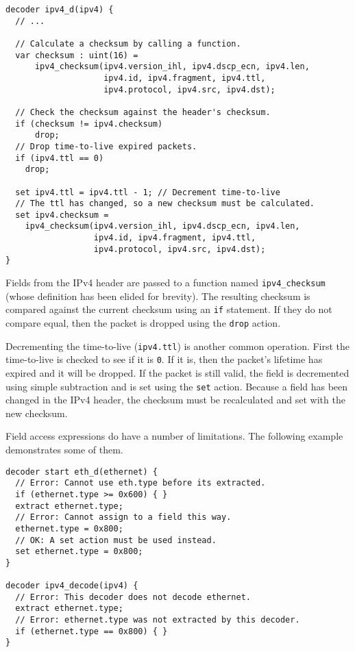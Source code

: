 \begin{codepage}
\begin{lstlisting}
decoder ipv4_d(ipv4) {
  // ...
  
  // Calculate a checksum by calling a function.
  var checksum : uint(16) =
      ipv4_checksum(ipv4.version_ihl, ipv4.dscp_ecn, ipv4.len, 
                    ipv4.id, ipv4.fragment, ipv4.ttl, 
                    ipv4.protocol, ipv4.src, ipv4.dst);

  // Check the checksum against the header's checksum.
  if (checksum != ipv4.checksum)
	  drop;
  // Drop time-to-live expired packets.
  if (ipv4.ttl == 0)
    drop;

  set ipv4.ttl = ipv4.ttl - 1; // Decrement time-to-live
  // The ttl has changed, so a new checksum must be calculated.
  set ipv4.checksum =
    ipv4_checksum(ipv4.version_ihl, ipv4.dscp_ecn, ipv4.len, 
                  ipv4.id, ipv4.fragment, ipv4.ttl, 
                  ipv4.protocol, ipv4.src, ipv4.dst);
}
\end{lstlisting}
\end{codepage}

Fields from the IPv4 header are passed to a function named 
\texttt{ipv4\_checksum} (whose definition has been elided for brevity). The 
resulting checksum is compared against the current checksum using an \texttt{if} 
statement. If they do not compare equal, then the packet is dropped using the 
\texttt{drop} action.

Decrementing the time-to-live (\texttt{ipv4.ttl}) is another common operation. 
First the time-to-live is checked to see if it is \texttt{0}. If it is, then the 
packet's lifetime has expired and it will be dropped. If the packet is still 
valid, the field is decremented using simple subtraction and is set using the 
\texttt{set} action. Because a field has been changed in the IPv4 
header, the checksum must be recalculated and set with the new checksum.

Field access expressions do have a number of limitations. The following example
demonstrates some of them.

\begin{codepage}
\begin{lstlisting}
decoder start eth_d(ethernet) {
  // Error: Cannot use eth.type before its extracted.
  if (ethernet.type >= 0x600) { }
  extract ethernet.type;
  // Error: Cannot assign to a field this way.
  ethernet.type = 0x800;
  // OK: A set action must be used instead.
  set ethernet.type = 0x800;
}

decoder ipv4_decode(ipv4) {
  // Error: This decoder does not decode ethernet.
  extract ethernet.type;
  // Error: ethernet.type was not extracted by this decoder.
  if (ethernet.type == 0x800) { }
}
\end{lstlisting}
\end{codepage}

